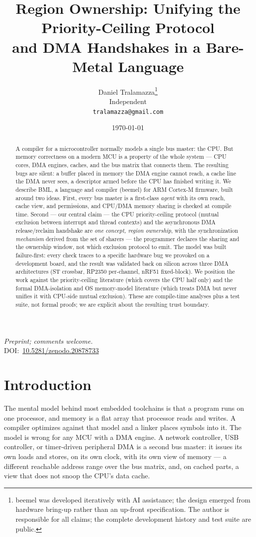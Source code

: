 \documentclass[10pt,twocolumn]{article}
\title{\textbf{Region Ownership: Unifying the Priority-Ceiling Protocol\\
and DMA Handshakes in a Bare-Metal Language}}
\author{Daniel Tralamazza\thanks{beemel was developed iteratively with AI
assistance; the design emerged from hardware bring-up rather than an up-front
specification. The author is responsible for all claims; the complete
development history and test suite are public.}\\
\small Independent\\
\small \texttt{tralamazza@gmail.com}}
\date{\today}
\begin{document}
\maketitle
\begin{center}
\small\emph{Preprint; comments welcome.}\\[3pt]
\small DOI:~\href{https://doi.org/10.5281/zenodo.20878733}{10.5281/zenodo.20878733}
\end{center}
\vspace{0.5em}

\begin{abstract}
A compiler for a microcontroller normally models a single bus master: the CPU.
But memory correctness on a modern MCU is a property of the whole system --- CPU
cores, DMA engines, caches, and the bus matrix that connects them. The resulting
bugs are silent: a buffer placed in memory the DMA engine cannot reach, a cache
line the DMA never sees, a descriptor armed before the CPU has finished writing
it. We describe BML, a language and compiler (beemel) for ARM Cortex-M firmware,
built around two ideas. First, every bus master is a first-class \emph{agent}
with its own reach, cache view, and permissions, and CPU/DMA memory sharing is
checked at compile time. Second --- our central claim --- the CPU
priority-ceiling protocol (mutual exclusion between interrupt and thread
contexts) and the asynchronous DMA release/reclaim handshake are \emph{one
concept, region ownership}, with the synchronization \emph{mechanism} derived
from the set of sharers --- the programmer declares the sharing and the ownership
window, not which exclusion protocol to emit. The model was
built failure-first: every check traces to a specific hardware bug we provoked
on a development board, and the result was validated back on silicon across
three DMA architectures (ST crossbar, RP2350 per-channel, nRF51 fixed-block). We
position the work against the priority-ceiling literature (which covers the CPU
half only) and the formal DMA-isolation and OS memory-model literature (which
treats DMA but never unifies it with CPU-side mutual exclusion). These are
compile-time analyses plus a test suite, not formal proofs; we are explicit
about the resulting trust boundary.
\end{abstract}

\section{Introduction}

The mental model behind most embedded toolchains is that a program runs on one
processor, and memory is a flat array that processor reads and writes. A
compiler optimizes against that model and a linker places symbols into it. The
model is wrong for any MCU with a DMA engine. A network controller, USB
controller, or timer-driven peripheral DMA is a second bus master: it issues its
own loads and stores, on its own clock, with its own view of memory --- a
different reachable address range over the bus matrix, and, on cached parts, a
view that does not snoop the CPU's data cache.
\end{document}
